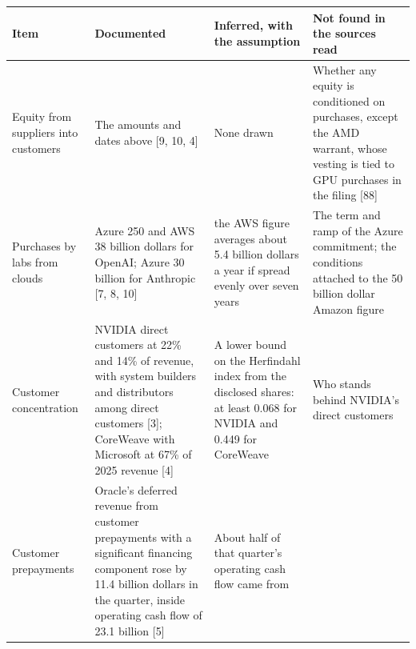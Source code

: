 \documentclass[10pt,letterpaper]{article}
\newcounter{none}
\begin{document}
{\def\LTcaptype{none} %
{\footnotesize\setlength{\tabcolsep}{3.8pt}\renewcommand{\arraystretch}{1.15}
\begin{longtable}[]{@{}
  >{\raggedright\arraybackslash}p{}
  >{\raggedright\arraybackslash}p{}
  >{\raggedright\arraybackslash}p{}
  >{\raggedright\arraybackslash}p{}@{}}
\toprule\noalign{}
\begin{minipage}[b]{\linewidth}\raggedright
\textbf{Item}
\end{minipage} & \begin{minipage}[b]{\linewidth}\raggedright
\textbf{Documented}
\end{minipage} & \begin{minipage}[b]{\linewidth}\raggedright
\textbf{Inferred, with the assumption}
\end{minipage} & \begin{minipage}[b]{\linewidth}\raggedright
\textbf{Not found in the sources read}
\end{minipage} \\
\midrule\noalign{}
\endhead
\bottomrule\noalign{}
\endlastfoot
Equity from suppliers into customers & The amounts and dates above {[}9,
10, 4{]} & None drawn & Whether any equity is conditioned on purchases,
except the AMD warrant, whose vesting is tied to GPU purchases in the
filing {[}88{]} \\
Purchases by labs from clouds & Azure 250 and AWS 38 billion dollars for
OpenAI; Azure 30 billion for Anthropic {[}7, 8, 10{]} & the AWS figure
averages about 5.4 billion dollars a year if spread evenly over seven
years & The term and ramp of the Azure commitment; the conditions
attached to the 50 billion dollar Amazon figure \\
Customer concentration & NVIDIA direct customers at 22\% and 14\% of
revenue, with system builders and distributors among direct customers
{[}3{]}; CoreWeave with Microsoft at 67\% of 2025 revenue {[}4{]} & A
lower bound on the Herfindahl index from the disclosed shares: at least
0.068 for NVIDIA and 0.449 for CoreWeave & Who stands behind NVIDIA's
direct customers \\
Customer prepayments & Oracle's deferred revenue from customer
prepayments with a significant financing component rose by 11.4 billion
dollars in the quarter, inside operating cash flow of 23.1 billion
{[}5{]} & About half of that quarter's operating cash flow came from

\end{longtable}}}
\end{document}
